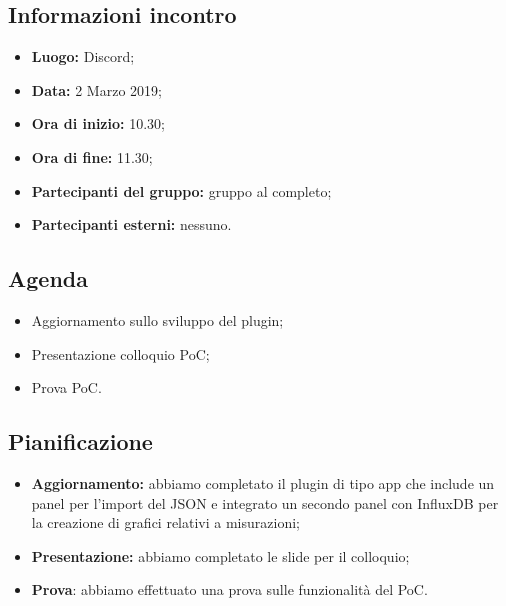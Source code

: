 \subsection{Informazioni incontro}
\begin{itemize}
	\item { \textbf{Luogo:} Discord};
	\item { \textbf{Data:} 2 Marzo 2019};
	\item { \textbf{Ora di inizio:} 10.30};
	\item { \textbf{Ora di fine:} 11.30};
	\item { \textbf{Partecipanti del gruppo:} gruppo al completo};
	\item { \textbf{Partecipanti esterni:} nessuno}.
\end{itemize}


\subsection{Agenda}
\begin{itemize}
	\item {Aggiornamento sullo sviluppo del plugin;}
	\item {Presentazione colloquio PoC;}
	\item {Prova PoC.}
\end{itemize}

\subsection{Pianificazione}
\begin{itemize}
	\item { \textbf{Aggiornamento:} abbiamo completato il plugin di tipo app che include un panel per l'import del JSON e integrato un secondo panel con InfluxDB per la creazione di grafici relativi a misurazioni;}
	\item { \textbf{Presentazione:} abbiamo completato le slide per il colloquio;}
	\item { \textbf{Prova}: abbiamo effettuato una prova sulle funzionalità del PoC.}
\end{itemize}

